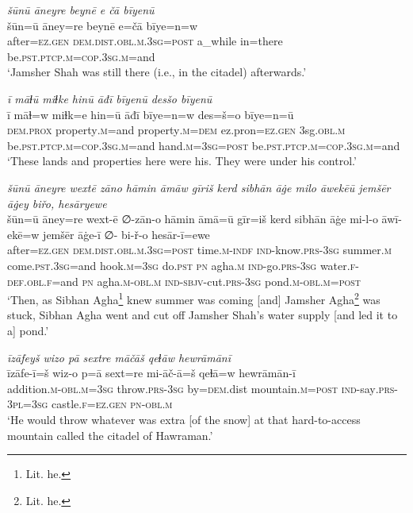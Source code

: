 \ea \label{DP.25}
\textit{šūnū āneyre beynē e čā bīyenū} \\ 
\gll šūn=ū āney=re beynē e=čā bīye=n=w \\ 
 after\textsc{=ez}\textsc{.gen} \textsc{dem.dist}\textsc{.obl}\textsc{.m}\textsc{.3sg}\textsc{=\textsc{post}} a\_while in=there be\textsc{.pst}\textsc{.ptcp}\textsc{.m}\textsc{=cop}\textsc{.3sg}\textsc{.m}=and \\ 
\glt `Jamsher Shah was still there (i.e., in the citadel) afterwards.'
\z 
 
\ea \label{DP.28}
\textit{ī māɫū miɫke hinū āđī bīyenū desšo bīyenū} \\ 
\gll ī māɫ=w miɫk=e hin=ū āđī bīye=n=w des=š=o bīye=n=ū \\ 
 \textsc{dem.prox} property\textsc{.m}=and property\textsc{.m}\textsc{=dem} ez.pron\textsc{=ez}\textsc{.gen} 3sg\textsc{.obl}\textsc{.m} be\textsc{.pst}\textsc{.ptcp}\textsc{.m}\textsc{=cop}\textsc{.3sg}\textsc{.m}=and hand\textsc{.m}\textsc{=3sg}\textsc{=\textsc{post}} be\textsc{.pst}\textsc{.ptcp}\textsc{.m}\textsc{=cop}\textsc{.3sg}\textsc{.m}=and \\ 
\glt `These lands and properties here were his. They were under his control.'
\z 
 
\ea \label{DP.30}
\textit{šūnū āneyre wextē zāno hāmin āmāw gīriš kerd sibhān āġe milo āwekēū jemšēr āġey biřo, hesāryewe} \\ 
\gll šūn=ū āney=re wext-ē ∅-zān-o hāmin āmā=ū gīr=iš kerd sibhān āġe mi-l-o āwī-ekē=w jemšēr āġe-ī ∅- bi-ř-o hesār-ī=ewe \\ 
 after\textsc{=ez}\textsc{.gen} \textsc{dem.dist}\textsc{.obl}\textsc{.m}\textsc{.3sg}\textsc{=\textsc{post}} time\textsc{.m}\textsc{-indf} \textsc{ind-}know\textsc{.prs}\textsc{-3sg} summer\textsc{.m} come\textsc{.pst}\textsc{.3sg}=and hook\textsc{.m}\textsc{=3sg} do\textsc{.pst} \textsc{pn} agha\textsc{.m} \textsc{ind-}go\textsc{.prs}\textsc{-3sg} water\textsc{\textsc{.f}}\textsc{-def}\textsc{.obl}\textsc{\textsc{.f}}=and \textsc{pn} agha\textsc{.m}\textsc{-obl}\textsc{.m} \textsc{ind-}\textsc{sbjv-}cut\textsc{.prs}\textsc{-3sg} pond\textsc{.m}\textsc{-obl}\textsc{.m}\textsc{=\textsc{post}} \\ 
\glt `Then, as Sibhan Agha\footnote{Lit. he.} knew summer was coming [and] Jamsher Agha\footnote{Lit. he.} was stuck, Sibhan Agha went and cut off Jamsher Shah’s water supply [and led it to a] pond.'
\z 
 
\ea \label{DP.35}
\textit{īzāfeyš wizo pā sextre māčāš qeɫāw hewrāmānī} \\ 
\gll īzāfe-ī=š wiz-o p=ā sext=re mi-āč-ā=š qeɫā=w hewrāmān-ī \\ 
 addition\textsc{.m}\textsc{-obl}\textsc{.m}\textsc{=3sg} throw\textsc{.prs}\textsc{-3sg} by\textsc{=dem}.dist mountain\textsc{.m}\textsc{=\textsc{post}} \textsc{ind-}say\textsc{.prs}\textsc{-3pl}\textsc{=3sg} castle\textsc{\textsc{.f}}\textsc{=ez}\textsc{.gen} \textsc{pn}\textsc{-obl}\textsc{.m} \\ 
\glt `He would throw whatever was extra [of the snow] at that hard-to-access mountain called the citadel of Hawraman.'
\z 
 
